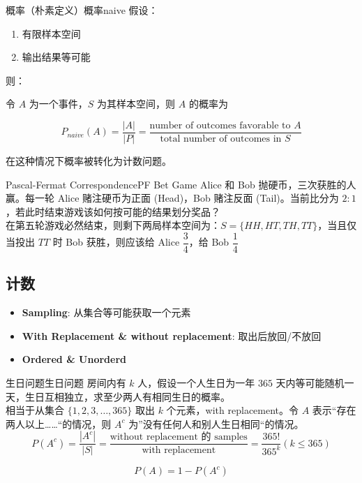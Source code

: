 \begin{definition}{概率（朴素定义）}{概率naive}
    假设：
    \begin{enumerate}
        \item 有限样本空间
        \item 输出结果等可能
    \end{enumerate}
    
    则：
    
    令 $A$ 为一个事件，$S$ 为其样本空间，则 $A$ 的概率为
    
    $$
    P_{naive}(A) = \frac{|A|}{|P|} = \frac{\text{number of outcomes favorable to } A}{\text{total number of outcomes in } S}
    $$
    
    在这种情况下概率被转化为计数问题。
\end{definition}

\begin{example}{Pascal-Fermat Correspondence}{PF Bet Game}
    Alice 和 Bob 抛硬币，三次获胜的人赢。每一轮 Alice 赌注硬币为正面 (Head)，Bob 赌注反面 (Tail)。当前比分为 $2 : 1$，若此时结束游戏该如何按可能的结果划分奖品？\\
    
    在第五轮游戏必然结束，则剩下两局样本空间为：$S = \{HH, HT, TH, TT\}$，当且仅当投出 $TT$ 时 Bob 获胜，则应该给 Alice $\dfrac{3}{4}$，给 Bob $\dfrac{1}{4}$
\end{example}

\subsection{计数}

\begin{itemize}
    \item \textbf{Sampling}: 从集合等可能获取一个元素
    \item \textbf{With Replacement \& without replacement}: 取出后放回/不放回
    \item \textbf{Ordered \& Unorderd}
\end{itemize}

\begin{example}{生日问题}{生日问题}
    房间内有 $k$ 人，假设一个人生日为一年 $365$ 天内等可能随机一天，生日互相独立，求至少两人有相同生日的概率。\\
    
    相当于从集合 $\{1, 2, 3, \dots, 365\}$ 取出 $k$ 个元素，with replacement。令 $A$ 表示“存在两人以上……“的情况，则 $A^c$ 为”没有任何人和别人生日相同“的情况。\\
    
    $$
    P(A^c) = \frac{|A^c|}{|S|} = \frac{\text{without replacement 的 samples}}{\text{with replacement}} = \frac{365!}{365^k} (k \leqslant 365)
    $$
    
    $$
    P(A) = 1 - P(A^c)
    $$
    
\end{example}


